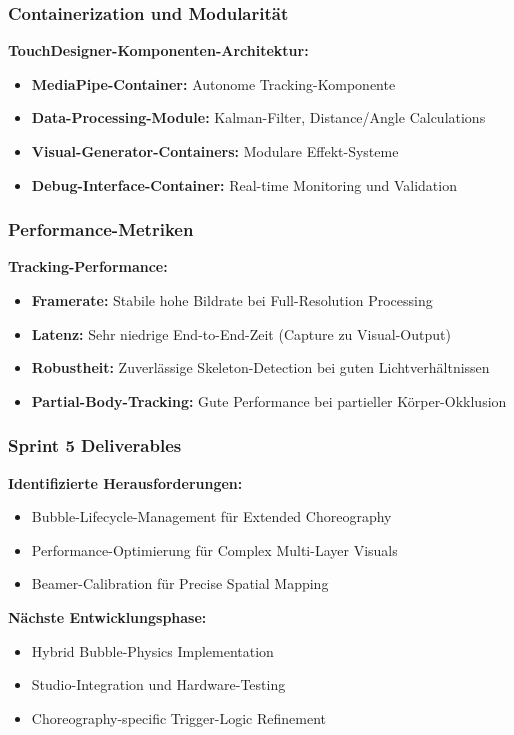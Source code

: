 \subsubsection{Containerization und Modularität}

\textbf{TouchDesigner-Komponenten-Architektur:}
\begin{itemize}
    \item \textbf{MediaPipe-Container:} Autonome Tracking-Komponente
    \item \textbf{Data-Processing-Module:} Kalman-Filter, Distance/Angle Calculations
    \item \textbf{Visual-Generator-Containers:} Modulare Effekt-Systeme
    \item \textbf{Debug-Interface-Container:} Real-time Monitoring und Validation
\end{itemize}

\subsubsection{Performance-Metriken}

\textbf{Tracking-Performance:}
\begin{itemize}
    \item \textbf{Framerate:} Stabile hohe Bildrate bei Full-Resolution Processing
    \item \textbf{Latenz:} Sehr niedrige End-to-End-Zeit (Capture zu Visual-Output)
    \item \textbf{Robustheit:} Zuverlässige Skeleton-Detection bei guten Lichtverhältnissen
    \item \textbf{Partial-Body-Tracking:} Gute Performance bei partieller Körper-Okklusion
\end{itemize}

\subsubsection{Sprint 5 Deliverables}

\textbf{Identifizierte Herausforderungen:}
\begin{itemize}
    \item Bubble-Lifecycle-Management für Extended Choreography
    \item Performance-Optimierung für Complex Multi-Layer Visuals
    \item Beamer-Calibration für Precise Spatial Mapping
\end{itemize}

\textbf{Nächste Entwicklungsphase:}
\begin{itemize}
    \item Hybrid Bubble-Physics Implementation
    \item Studio-Integration und Hardware-Testing
    \item Choreography-specific Trigger-Logic Refinement
\end{itemize}